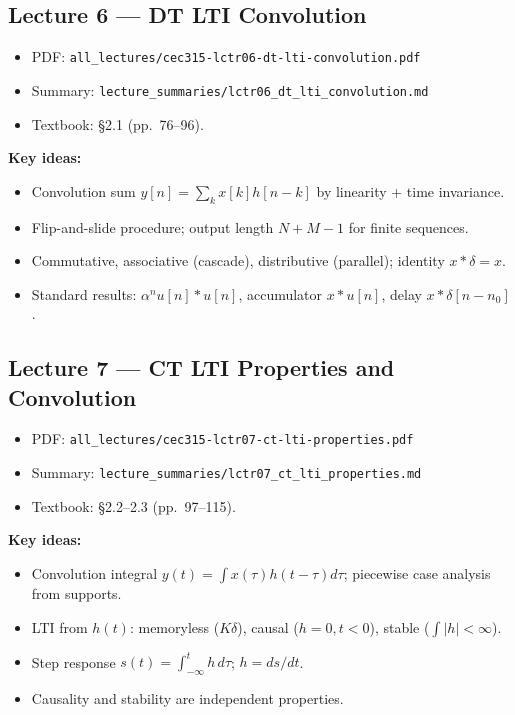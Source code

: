 \documentclass[11pt]{article}
\newcommand{\Conv}{\ast}
\begin{document}
\subsection{Lecture 6 --- DT LTI Convolution}
\begin{itemize}[leftmargin=*]
  \item PDF: \texttt{all\_lectures/cec315-lctr06-dt-lti-convolution.pdf}
  \item Summary: \texttt{lecture\_summaries/lctr06\_dt\_lti\_convolution.md}
  \item Textbook: \S 2.1 (pp.~76--96).
\end{itemize}
\textbf{Key ideas:}
\begin{itemize}[leftmargin=*]
  \item Convolution sum $y[n]=\sum_k x[k]h[n-k]$ by linearity + time invariance.
  \item Flip-and-slide procedure; output length $N+M-1$ for finite sequences.
  \item Commutative, associative (cascade), distributive (parallel); identity $x\Conv\delta=x$.
  \item Standard results: $\alpha^n u[n]\Conv u[n]$, accumulator $x\Conv u[n]$, delay $x\Conv\delta[n-n_0]$.
\end{itemize}

\subsection{Lecture 7 --- CT LTI Properties and Convolution}
\begin{itemize}[leftmargin=*]
  \item PDF: \texttt{all\_lectures/cec315-lctr07-ct-lti-properties.pdf}
  \item Summary: \texttt{lecture\_summaries/lctr07\_ct\_lti\_properties.md}
  \item Textbook: \S 2.2--2.3 (pp.~97--115).
\end{itemize}
\textbf{Key ideas:}
\begin{itemize}[leftmargin=*]
  \item Convolution integral $y(t)=\int x(\tau)h(t-\tau)d\tau$; piecewise case analysis from supports.
  \item LTI from $h(t)$: memoryless ($K\delta$), causal ($h=0,t<0$), stable ($\int|h|<\infty$).
  \item Step response $s(t)=\int_{-\infty}^t h\,d\tau$; $h=ds/dt$.
  \item Causality and stability are independent properties.
\end{itemize}
\end{document}
